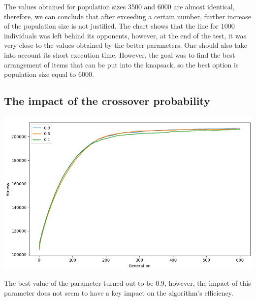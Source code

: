 \documentclass[12pt]{article}
\begin{document}
The values obtained for population sizes 3500 and 6000 are almost identical, therefore, we can conclude that after exceeding a certain number, further increase of the population size is not justified. The chart shows that the line for 1000 individuals was left behind its opponents, however, at the end of the test, it was very close to the values obtained by the better parameters. One should also take into account its short execution time. However, the goal was to find the best arrangement of items that can be put into the knapsack, so the best option is population size equal to 6000.

\subsection{The impact of the crossover probability}
\hspace*{-1.5cm}
\includegraphics[scale=0.55]{crossover}

The best value of the parameter turned out to be 0.9, however, the impact of this parameter does not seem to have a key impact on the algorithm's efficiency.
\end{document}
